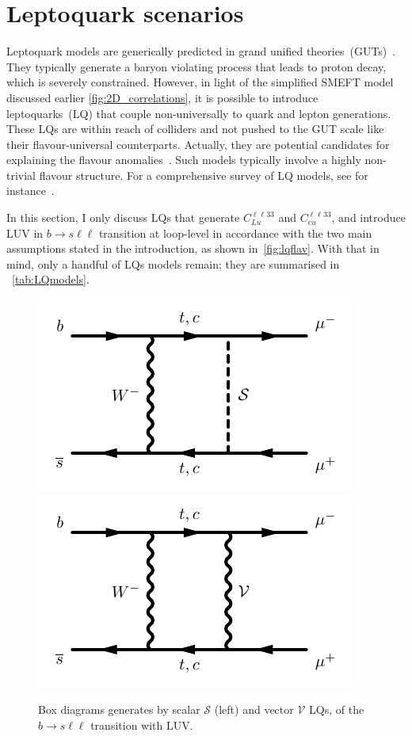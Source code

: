 \section{Leptoquark scenarios}
\label{sec:mod_Leptoquarks}
\par Leptoquark models are generically predicted in grand unified  theories~(GUTs)~\cite{Pati:1974yy,PhysRevLett.32.438}. They typically generate a baryon violating process that leads to proton decay, which is severely constrained. However, in light of the simplified SMEFT model discussed earlier \autoref{fig:2D_correlations}, it is possible to introduce leptoquarks~(LQ) that couple non-universally to quark and lepton generations.  These LQs are within reach of colliders and not pushed to the GUT scale like their flavour-universal counterparts. Actually, they are potential candidates for explaining the flavour anomalies~\cite{Camargo-Molina:2018cwu,Coy:2019rfr}.  Such models typically involve a highly non-trivial flavour structure.  For a comprehensive survey of LQ models, see for instance~\cite{Buchmuller:1986zs,delAguila:2010mx,Alonso:2015sja,Dorsner:2016wpm,deBlas:2017xtg}. \\
\par In this section, I only discuss LQs that generate  $C_ {Lu}^{\ell \ell33}$ and $C_{eu}^{\ell \ell33} $, and introduce LUV in $b \to s \ell \ell$ transition at loop-level in accordance with the two main assumptions stated in the introduction, as shown in~\autoref{fig:lqflav}. With that in mind, only a handful of LQs models remain; they are summarised in ~\autoref{tab:LQmodels}.
\begin{figure}[htpb!]
	\centering 
	\includegraphics[width=0.45\linewidth]{figures/x_bsllSLQ}
	\includegraphics[width=0.45\linewidth]{figures/x_bsllVLQ}
	\caption{Box diagrams generates by scalar $\mathcal S$ (left) and vector $\mathcal V$ LQs, of the $b \to s \ell \ell$ transition with LUV. }    
	\label{fig:lqflav}
\end{figure}
